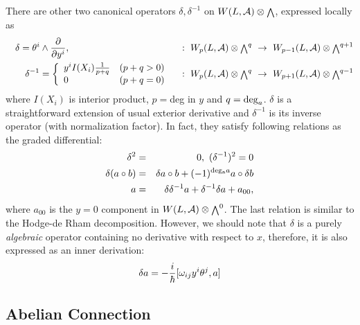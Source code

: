 \documentclass[10pt,a4paper]{article}
\def\h{\hbar}
\begin{document}
There are other two canonical operators $\delta,\delta^{-1}$ on $W(L,{\cal A})\otimes{\scriptstyle \bigwedge}$, expressed locally as
\begin{eqnarray}
&&\delta=\theta^i\wedge{\partial\over\partial y^i}, \qquad \qquad \qquad \qquad \qquad \qquad  
: \ W_p(L,{\cal A})\otimes{\scriptstyle \bigwedge}^q \ \rightarrow \ W_{p-1}(L,{\cal A})\otimes{\scriptstyle \bigwedge}^{q+1} \nonumber\\
&&\delta^{-1}=\left\{
\begin{array}{ll}
y^iI(X_i){1\over p+q}  & (p+q>0)       \\
     0             & (p+q=0)
\end{array}
\right. \ \ \ : \ W_p(L,{\cal A})\otimes{\scriptstyle \bigwedge}^q \ \rightarrow \ W_{p+1}(L,{\cal A})\otimes{\scriptstyle \bigwedge}^{q-1}
\end{eqnarray}
where $I(X_i)$ is interior product, $p=$deg in $y$ and $q={\rm deg}_a$. $\delta$ is a straightforward extension of usual exterior derivative and $\delta^{-1}$ is its inverse operator (with normalization factor).
In fact, they satisfy following relations as the graded differential:
\begin{eqnarray}
\label{eqn:delrel}
       \delta^2 &=& 0,\  (\delta^{-1})^2=0 \nonumber\\
       \delta(a\circ b) &=&\delta a\circ b+(-1)^{{\rm deg_a}a} a\circ \delta b \nonumber\\
       a&=&\delta\delta ^{-1}a+\delta^{-1}\delta a+a_{00},
\end{eqnarray}
where $a_{00}$ is the $y=0$ component in $W(L,{\cal A})\otimes{\scriptstyle \bigwedge}^0$. The last relation is similar to the Hodge-de Rham decomposition.
However, we should note that $\delta$ is a purely {\it algebraic} operator containing no derivative with respect to $x$, therefore, it is also expressed as an inner derivation:
\begin{equation}
\delta a=-{i\over\h}[\omega_{ij}y^i\theta^j,a]
\end{equation}


\subsection{Abelian Connection
\label{sec:abcon}}
\end{document}
